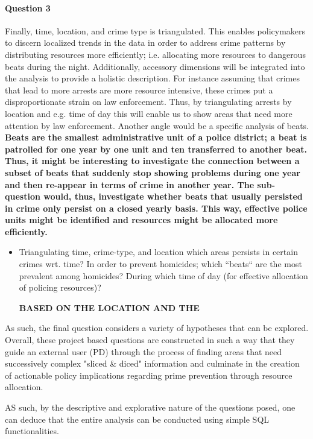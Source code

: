 \documentclass[a4paper]{article}
\begin{document}
\paragraph{Question 3} Finally, time, location, and crime type is triangulated. This enables policymakers to discern localized trends in the data in order to address crime patterns by distributing resources more efficiently; i.e. allocating more resources to dangerous beats during the night. Additionally, accessory dimensions will be integrated into the analysis to provide a holistic description. For instance assuming that crimes that lead to more arrests are more resource intensive, these crimes put a disproportionate strain on law enforcement. Thus, by triangulating arrests by location and e.g. time of day this will enable us to show areas that need more attention by law enforcement. Another angle would be a specific analysis of beats. \textbf{Beats are the smallest administrative unit of a police district; a beat is patrolled for one year by one unit and ten transferred to another beat. Thus, it might be interesting to investigate the connection between a subset of beats that suddenly stop showing problems during one year and then re-appear in terms of crime in another year. The sub-question would, thus, investigate whether beats that usually persisted in crime only persist on a closed yearly basis. This way, effective police units might be identified and resources might be allocated more efficiently.}
 
\begin{itemize}
  \item Triangulating time, crime-type, and location which areas persists in certain crimes wrt. time?
In order to prevent homicides; which “beats“ are the most prevalent among homicides? During which time of day (for effective allocation of policing resources)? 

\textbf{BASED ON THE LOCATION AND THE }
\end{itemize}

As such, the final question considers a variety of hypotheses that can be explored. Overall, these project based questions are constructed in such a way that they guide an external user (PD) through the process of finding areas that need successively complex "sliced \& diced" information and culminate in the creation of actionable policy implications regarding prime prevention through resource allocation.

AS such, by the descriptive and explorative nature of the questions posed, one can deduce that the entire analysis can be conducted using simple SQL functionalities.
\end{document}
